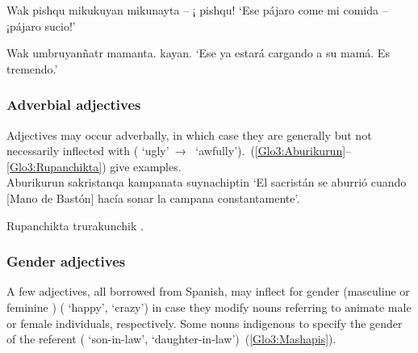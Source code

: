 {%
%
{Wak pishqu mikukuyan mikunayta -- ¡ pishqu!}%
{}%
{‘Ese pájaro come mi comida -- ¡pájaro sucio!’}%
{}{}%

%
{Wak umbruyanñatr mamanta.  kayan.}%
{}%
{‘Ese ya estará cargando a su mamá. Es tremendo.’}%
{}{}%

\subsubsection{Adverbial adjectives}
Adjectives may occur adverbally, in which case they are generally but not necessarily inflected with  ( ‘ugly’~→~ ‘awfully’).~(\ref{Glo3:Aburikurun}--\ref{Glo3:Rupanchikta}) give examples.\\

%
{Aburikurun sakristanqa  kampanata suynachiptin}%
{}%
{‘El sacristán se aburrió cuando [Mano de Bastón] hacía sonar la campana constantamente’.}%
{}{}%

%
{Rupanchikta trurakunchik .}%
{}%
{}{}%

\subsubsection{Gender adjectives}
A few adjectives, all borrowed from Spanish, may inflect for gender (masculine  or feminine ) ( ‘happy’,  ‘crazy’) in case they modify nouns referring to animate male or female individuals, respectively. Some nouns indigenous to \SYQ{} specify the gender of the referent ( ‘son-in-law’,  ‘daughter-in-law’)~(\ref{Glo3:Mashapis}).\\

}
